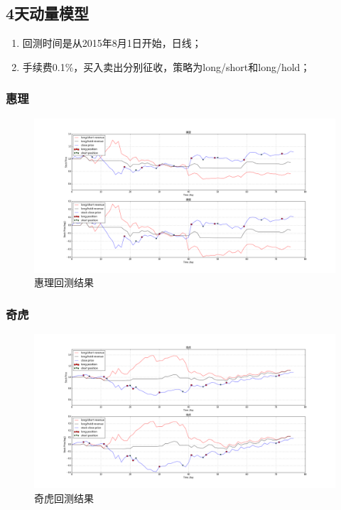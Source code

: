 \documentclass[12pt,a4paper]{article}
\begin{document}
\subsection{4天动量模型}

\begin{enumerate}
\item 回测时间是从2015年8月1日开始，日线；
\item 手续费0.1\%，买入卖出分别征收，策略为long/short和long/hold；
\end{enumerate}

\subsubsection{惠理}

\begin{figure}[H]
	\centering
	\includegraphics[width=1.0\textwidth]{img/0806.hk.png}
	\caption{惠理回测结果}
\end{figure}


\subsubsection{奇虎}

\begin{figure}[H]
	\centering
	\includegraphics[width=1.0\textwidth]{img/qihu.n.png}
	\caption{奇虎回测结果}
\end{figure}
\end{document}
